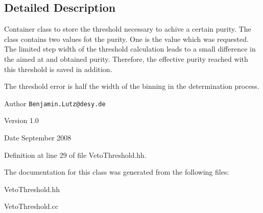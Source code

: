 \subsection{Detailed Description}
Container class to store the threshold necessary to achive a certain purity. The class contains two values fot the purity. One is the value which was requested. The limited step width of the threshold calculation leads to a small difference in the aimed at and obtained purity. Therefore, the effective purity reached with this threshold is saved in addition.

The threshold error is half the width of the binning in the determination process.

\begin{DoxyAuthor}{Author}
{\tt Benjamin.Lutz@desy.de} 
\end{DoxyAuthor}
\begin{DoxyVersion}{Version}
1.0 
\end{DoxyVersion}
\begin{DoxyDate}{Date}
September 2008 
\end{DoxyDate}


Definition at line 29 of file VetoThreshold.hh.

The documentation for this class was generated from the following files:\begin{DoxyCompactItemize}
\item 
VetoThreshold.hh\item 
VetoThreshold.cc\end{DoxyCompactItemize}
